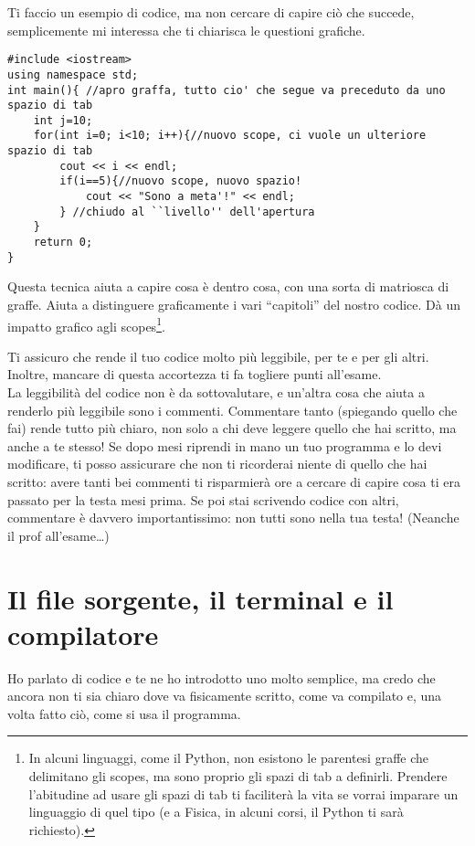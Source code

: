 Ti faccio un esempio di codice, ma non cercare di capire ciò che succede, semplicemente mi interessa che ti chiarisca le questioni grafiche.
	
	\begin{lstlisting}
#include <iostream>
using namespace std;
int main(){ //apro graffa, tutto cio' che segue va preceduto da uno spazio di tab
	int j=10;
	for(int i=0; i<10; i++){//nuovo scope, ci vuole un ulteriore spazio di tab
		cout << i << endl;
		if(i==5){//nuovo scope, nuovo spazio!
			cout << "Sono a meta'!" << endl;
		} //chiudo al ``livello'' dell'apertura
	} 
	return 0;
}
	\end{lstlisting} 
Questa tecnica aiuta a capire cosa è dentro cosa, con una sorta di matriosca di graffe. Aiuta a distinguere graficamente i vari ``capitoli'' del nostro codice. Dà un impatto grafico agli scopes\footnote{In alcuni linguaggi, come il Python, non esistono le parentesi graffe che delimitano gli scopes, ma sono proprio gli spazi di tab a definirli. Prendere l'abitudine ad usare gli spazi di tab ti faciliterà la vita se vorrai imparare un linguaggio di quel tipo (e a Fisica, in alcuni corsi, il Python ti sarà richiesto).}. 

Ti assicuro che rende il tuo codice molto più leggibile, per te e per gli altri. Inoltre, mancare di questa accortezza ti fa togliere punti all'esame.
\\

La leggibilità del codice non è da sottovalutare, e un'altra cosa che aiuta a renderlo più leggibile sono i commenti. Commentare tanto (spiegando quello che fai) rende tutto più chiaro, non solo a chi deve leggere quello che hai scritto, ma anche a te stesso! Se dopo mesi riprendi in mano un tuo programma e lo devi modificare, ti posso assicurare che non ti ricorderai niente di quello che hai scritto: avere tanti bei commenti ti risparmierà ore a cercare di capire cosa ti era passato per la testa mesi prima. Se poi stai scrivendo codice con altri, commentare è davvero importantissimo: non tutti sono nella tua testa! (Neanche il prof all'esame\ldots)

\section{Il file sorgente, il terminal e il compilatore}
Ho parlato di codice e te ne ho introdotto uno molto semplice, ma credo che ancora non ti sia chiaro dove va fisicamente scritto, come va compilato e, una volta fatto ciò, come si usa il programma.


